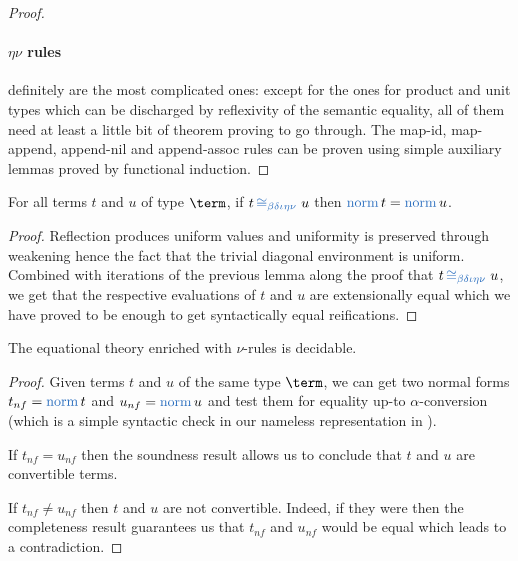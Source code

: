 \begin{proof}
\paragraph{$\eta\nu$ rules} definitely are the most complicated ones: except
for the ones for product and unit types which can be discharged by reflexivity of
the semantic equality, all of them need at least a little bit of theorem proving
to go through. The map-id, map-append, append-nil and append-assoc rules can be
proven using simple auxiliary lemmas proved by functional induction.
\end{proof}

\begin{corollary}[Completeness] For all terms $t$ and $u$ of type $\term$, if
$t \conv u$ then $\norm t = \norm u$.
\end{corollary}
\begin{proof}Reflection produces uniform values and uniformity is preserved
through weakening hence the fact that the trivial diagonal environment is uniform.
Combined with iterations of the previous lemma along the proof that $t \conv u$,
we get that the respective evaluations of $t$ and $u$ are extensionally equal which
we have proved to be enough to get syntactically equal reifications.
\end{proof}


\begin{corollary}The equational theory enriched with $\nu$-rules is decidable.
\end{corollary}
\begin{proof}Given terms $t$ and $u$ of the same type $\term$, we can get two normal
forms $t_{nf} = \norm t$ and $u_{nf} = \norm u$ and test them for equality up-to
$\alpha$-conversion (which is a simple syntactic check in our nameless representation
in \agda{}).

If $t_{nf} = u_{nf}$ then the soundness result allows us to conclude that $t$
and $u$ are convertible terms.

If $t_{nf} \neq u_{nf}$ then $t$ and $u$ are not convertible. Indeed, if they
were then the completeness result guarantees us that $t_{nf}$ and $u_{nf}$ would
be equal which leads to a contradiction.
\end{proof}

